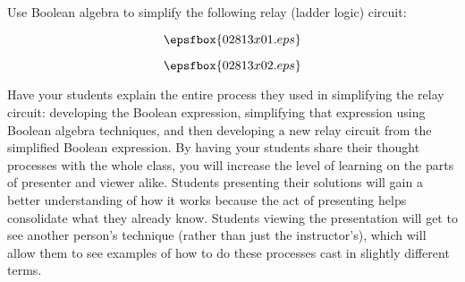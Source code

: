 

Use Boolean algebra to simplify the following relay (ladder logic) circuit:

$$\epsfbox{02813x01.eps}$$







$$\epsfbox{02813x02.eps}$$







Have your students explain the entire process they used in simplifying the relay circuit: developing the Boolean expression, simplifying that expression using Boolean algebra techniques, and then developing a new relay circuit from the simplified Boolean expression.  By having your students share their thought processes with the whole class, you will increase the level of learning on the parts of presenter and viewer alike.  Students presenting their solutions will gain a better understanding of how it works because the act of presenting helps consolidate what they already know.  Students viewing the presentation will get to see another person's technique (rather than just the instructor's), which will allow them to see examples of how to do these processes cast in slightly different terms.




